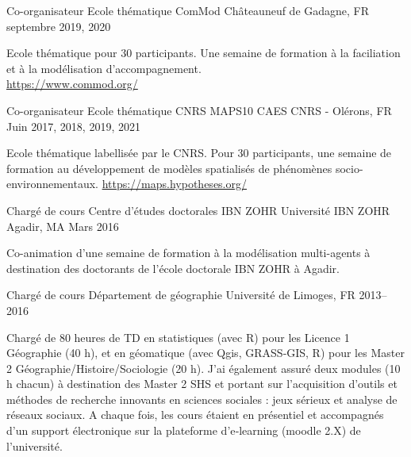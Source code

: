 \begin{cventries}
{\begin{cvitems}
      \end{cvitems}
      }
    \cventry
      {Co-organisateur} %
      {Ecole thématique ComMod} %
      {Châteauneuf de Gadagne, FR} %
      {septembre 2019, 2020} %
      {
      \begin{cvitems} %
        Ecole thématique pour 30 participants. Une semaine de formation à la faciliation et à la modélisation d'accompagnement.\\
        \url{https://www.commod.org/}
      \end{cvitems}
      }
  \cventry
    {Co-organisateur} %
    {Ecole thématique CNRS MAPS10} %
    {CAES CNRS - Olérons, FR} %
    {Juin 2017, 2018, 2019, 2021} %
    {
      \begin{cvitems} %
        Ecole thématique labellisée par le CNRS. Pour 30 participants, une semaine de formation au développement de modèles spatialisés de phénomènes socio-environnementaux. \url{https://maps.hypotheses.org/}
        \end{cvitems}
    }

\cventry
  {Chargé de cours} %
  {Centre d'études doctorales IBN ZOHR} %
  {Université IBN ZOHR Agadir, MA} %
  {Mars 2016} %
  {
    \begin{cvitems} %
      Co-animation d'une semaine de formation à la modélisation multi-agents à destination des doctorants de l'école doctorale IBN ZOHR à Agadir.
    \end{cvitems}
  }


\cventry
  {Chargé de cours} %
  {Département de géographie} %
  {Université de Limoges, FR} %
  {2013--2016} %
  {
    \begin{cvitems} %
    Chargé de 80 heures de TD en statistiques (avec R) pour les Licence 1 Géographie (40 h), et en géomatique (avec Qgis, GRASS‑GIS, R) pour les Master 2 Géographie/Histoire/Sociologie (20 h). J’ai également assuré deux modules (10 h chacun) à destination des Master 2 SHS et portant sur l’acquisition d’outils et méthodes de recherche innovants en sciences sociales : jeux sérieux et analyse de réseaux sociaux. A chaque fois, les cours étaient en présentiel et accompagnés d’un support électronique sur la plateforme d’e‑learning (moodle 2.X) de l’université.
    \end{cvitems}
  }


\end{cventries}
